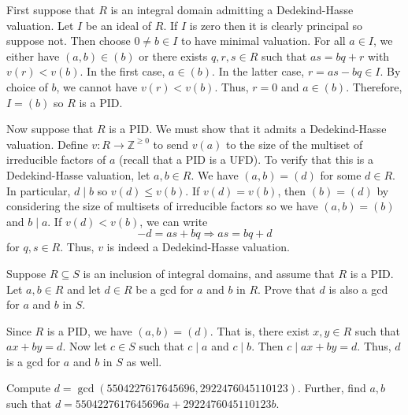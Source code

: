 \documentclass[../../master.tex]{subfiles}
\begin{document}
    \begin{solution}
        First suppose that $R$ is an integral domain admitting a Dedekind-Hasse
        valuation. Let $I$ be an ideal of $R$. If $I$ is zero then it is clearly
        principal so suppose not. Then choose $0 \neq b \in I$ to have minimal
        valuation. For all $a \in I$, we either have $(a, b) \in (b)$ or there
        exists $q, r, s \in R$ such that $as = bq + r$ with $v(r) < v(b)$. In
        the first case, $a \in (b)$. In the latter case, $r = as - bq \in I$. By
        choice of $b$, we cannot have $v(r) < v(b)$. Thus, $r = 0$ and $a \in
        (b)$. Therefore, $I = (b)$ so $R$ is a PID.

        Now suppose that $R$ is a PID. We must show that it admits a
        Dedekind-Hasse valuation. Define $v: R \to \mathbb{Z}^{\geq 0}$ to send
        $v(a)$ to the size of the multiset of irreducible factors of $a$ (recall
        that a PID is a UFD). To verify that this is a Dedekind-Hasse valuation,
        let $a, b \in R$. We have $(a, b) = (d)$ for some
        $d \in R$. In particular, $d \mid b$ so $v(d) \leq v(b)$. If $v(d) =
        v(b)$, then $(b) = (d)$ by considering the size of multisets of irreducible
        factors so we have $(a, b) = (b)$ and $b \mid a$. If $v(d) < v(b)$, we can
        write
        \[
        -d = as + bq \Longrightarrow as = bq + d
        \] 
        for $q, s \in R$. Thus, $v$ is indeed a Dedekind-Hasse valuation.
    \end{solution}

    \begin{problem}
        Suppose $R \subseteq S$ is an inclusion of integral domains, and assume
        that $R$ is a PID. Let $a, b \in R$ and let $d \in R$ be a gcd for $a$
        and $b$ in $R$. Prove that $d$ is also a gcd for $a$ and $b$ in $S$.
    \end{problem}

    \begin{solution}
        Since $R$ is a PID, we have $(a, b) = (d)$. That is, there exist  $x, y
        \in R$ such that $ax + by = d$. Now let $c \in S$ such that $c \mid a$
        and $c \mid b$. Then $c \mid ax + by = d$. Thus, $d $ is a gcd for $a$
        and $b$ in $S$ as well.
    \end{solution}

    \begin{problem}
        Compute $d = \gcd(5504227617645696, 2922476045110123)$. Further, find
        $a, b$ such that $d = 5504227617645696a + 2922476045110123b$.
    \end{problem}
\end{document}
